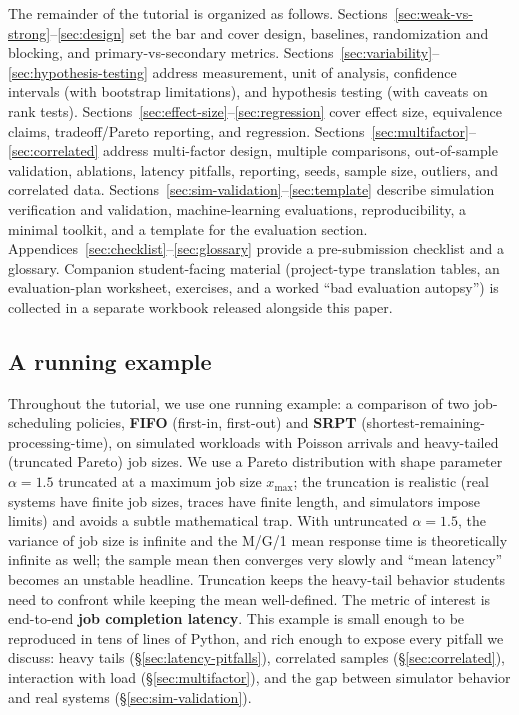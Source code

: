 \documentclass[11pt]{article}
\begin{document}
The remainder of the tutorial is organized as follows. Sections~\ref{sec:weak-vs-strong}--\ref{sec:design} set the bar and cover design, baselines, randomization and blocking, and primary-vs-secondary metrics. Sections~\ref{sec:variability}--\ref{sec:hypothesis-testing} address measurement, unit of analysis, confidence intervals (with bootstrap limitations), and hypothesis testing (with caveats on rank tests). Sections~\ref{sec:effect-size}--\ref{sec:regression} cover effect size, equivalence claims, tradeoff/Pareto reporting, and regression. Sections~\ref{sec:multifactor}--\ref{sec:correlated} address multi-factor design, multiple comparisons, out-of-sample validation, ablations, latency pitfalls, reporting, seeds, sample size, outliers, and correlated data. Sections~\ref{sec:sim-validation}--\ref{sec:template} describe simulation verification and validation, machine-learning evaluations, reproducibility, a minimal toolkit, and a template for the evaluation section. Appendices~\ref{sec:checklist}--\ref{sec:glossary} provide a pre-submission checklist and a glossary. Companion student-facing material (project-type translation tables, an evaluation-plan worksheet, exercises, and a worked ``bad evaluation autopsy'') is collected in a separate workbook released alongside this paper.

\subsection*{A running example}

Throughout the tutorial, we use one running example: a comparison of two job-scheduling policies, \textbf{FIFO} (first-in, first-out) and \textbf{SRPT} (shortest-remaining-processing-time), on simulated workloads with Poisson arrivals and heavy-tailed (truncated Pareto) job sizes. We use a Pareto distribution with shape parameter $\alpha = 1.5$ truncated at a maximum job size $x_{\max}$; the truncation is realistic (real systems have finite job sizes, traces have finite length, and simulators impose limits) and avoids a subtle mathematical trap. With untruncated $\alpha = 1.5$, the variance of job size is infinite and the M/G/1 mean response time is theoretically infinite as well; the sample mean then converges very slowly and ``mean latency'' becomes an unstable headline. Truncation keeps the heavy-tail behavior students need to confront while keeping the mean well-defined. The metric of interest is end-to-end \textbf{job completion latency}. This example is small enough to be reproduced in tens of lines of Python, and rich enough to expose every pitfall we discuss: heavy tails (\S\ref{sec:latency-pitfalls}), correlated samples (\S\ref{sec:correlated}), interaction with load (\S\ref{sec:multifactor}), and the gap between simulator behavior and real systems (\S\ref{sec:sim-validation}).
\end{document}
